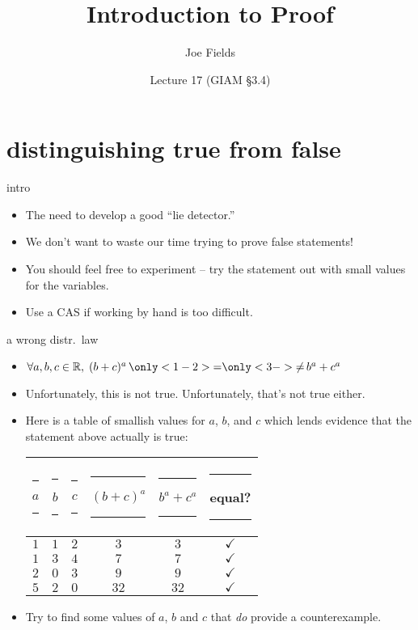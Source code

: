 \documentclass[landscape]{beamer}
\author{Joe Fields}
\title{Introduction to Proof}
\date{Lecture 17 (GIAM \S 3.4)}
\institute[SCSU]{ {\tt fieldsj1@southernct.edu} }
\begin{document}
\begin{frame}[plain]
  \titlepage
\end{frame}

\section{distinguishing true from false}

\begin{frame}{intro}
\begin{itemize}
\item The need to develop a good ``lie detector.'' \pause
\item We don't want to waste our time trying to prove false statements! \pause
\item You should feel free to experiment -- try the statement out with small values for the variables. \pause
\item Use a CAS if working by hand is too difficult.
\end{itemize}
\end{frame}

\begin{frame}{a wrong distr.\ law}
\begin{itemize}
\item $\forall a,b,c \in \Reals, \; (b+c)^a \, \only<1-2>{=} \only<3->{\neq} \, b^a + c^a$ \pause
\item Unfortunately, this is not true. \pause \pause Unfortunately, that's not true either. \pause
\item Here is a table of smallish values for $a$, $b$, and $c$ which lends evidence that the statement above actually is true: \pause

\begin{tabular}{ccc|c|c|c}
\rule{6pt}{0pt} $a$ \rule{6pt}{0pt} & \rule{6pt}{0pt} $b$ \rule{6pt}{0pt} & \rule{6pt}{0pt} $c$ \rule{6pt}{0pt} & \rule{6pt}{0pt} $(b+c)^a$ \rule{6pt}{0pt} & \rule{6pt}{0pt} $b^a + c^a$ \rule{6pt}{0pt} & \rule{6pt}{0pt} equal? \rule{6pt}{0pt} \\ \hline
\rule[-4pt]{0pt}{20pt} $1$ & $1$ & $2$ & $3$ & $3$ & $\checkmark$ \\
\rule[-4pt]{0pt}{20pt} $1$ & $3$ & $4$ & $7$ & $7$ & $\checkmark$ \\
\rule[-4pt]{0pt}{20pt} $2$ & $0$ & $3$ & $9$ & $9$ & $\checkmark$ \\
\rule[-4pt]{0pt}{20pt} $5$ & $2$ & $0$ & $32$ & $32$ & $\checkmark$ \\
\end{tabular}
\pause

\item Try to find some values of $a$, $b$ and $c$ that {\em do} provide a counterexample.

\end{itemize}
\end{frame}
\end{document}
